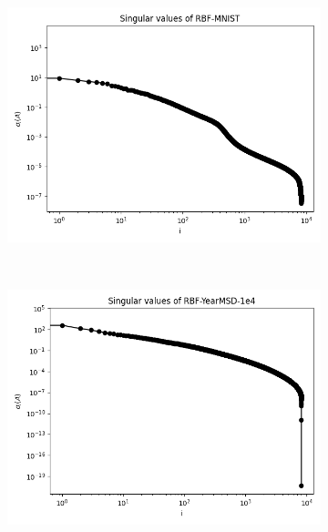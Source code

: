 \documentclass{article}
\theoremstyle{definition}
\begin{document}
\begin{figure}
\centering
\begin{subfigure}[t]{\textwidth+20pt\relax}
    \includegraphics[width=\dimexpr\linewidth-20pt\relax]
        {../plots/singular_values/singular_values_RBF-MNIST.png}
\end{subfigure}\
\begin{subfigure}[t]{\textwidth+20pt\relax}
    \includegraphics[width=\dimexpr\linewidth-20pt\relax]
        {../plots/singular_values/singular_values_RBF-YearMSD-1e4.png}

\end{subfigure}
\end{figure}
\end{document}
